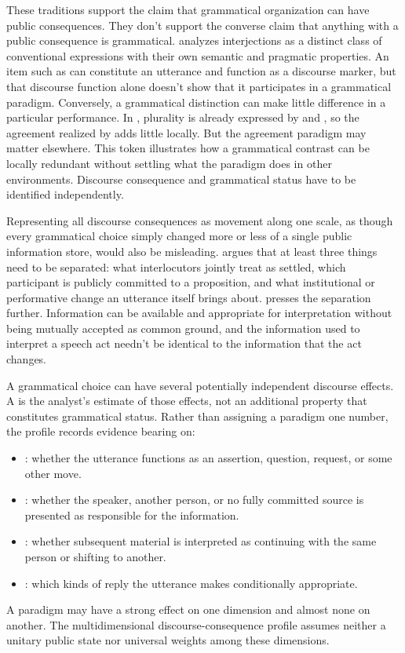 \documentclass[12pt,letterpaper]{article}
\begin{document}
These traditions support the claim that grammatical organization can have public
consequences. They don't support the converse claim that anything with a public
consequence is grammatical. \textcite[101--108]{ameka1992} analyzes interjections as a
distinct class of conventional expressions with their own semantic and pragmatic
properties. An item such as  can constitute an utterance and function
as a discourse marker, but that discourse function alone doesn't show that it
participates in a grammatical paradigm.
Conversely, a grammatical distinction can make little difference in a particular
performance. In , plurality is already expressed
by  and , so the agreement realized by
 adds little locally. But the agreement paradigm may matter
elsewhere. This token illustrates how a grammatical contrast can be
locally redundant without settling what the paradigm does in other environments.
Discourse consequence and grammatical status have to be identified independently.

Representing all discourse consequences as movement
along one scale, as though every grammatical choice simply changed more or less
of a single public information store, would also be misleading.
\textcite[505--506, 508--511, 515--519, 523--526]{bary2025speechacts} argues that at least three things need to be
separated: what interlocutors jointly treat as settled, which participant is
publicly committed to a proposition, and what institutional or performative
change an utterance itself brings about. \textcite[179--183, 201--209]{simons2025availability} presses
the separation further. Information can be available and appropriate for
interpretation without being mutually accepted as common ground, and the
information used to interpret a speech act needn't be identical to the information
that the act changes.

A grammatical choice can have several potentially independent discourse
effects. A  is the analyst's estimate of those
effects, not an additional property that constitutes grammatical status. Rather
than assigning a paradigm one number, the profile records evidence bearing on:
\begin{itemize}[leftmargin=*]
  \item {}: whether the utterance functions as an assertion,
  question, request, or some other move.
  \item {}: whether the speaker, another person,
  or no fully committed source is presented as responsible for the information.
  \item {}: whether subsequent material is
  interpreted as continuing with the same person or shifting to another.
  \item {}: which kinds of reply the utterance makes
  conditionally appropriate.
\end{itemize}
A paradigm may have a strong effect on one dimension and almost none on another.
The multidimensional discourse-consequence profile assumes neither a unitary
public state nor universal weights among these dimensions.
\end{document}
